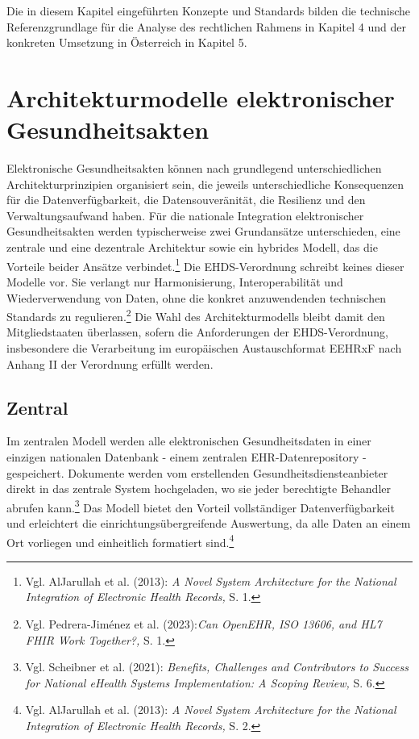 Die in diesem Kapitel eingeführten Konzepte und Standards bilden die technische Referenzgrundlage für die Analyse des rechtlichen Rahmens in Kapitel 4 und der konkreten Umsetzung in Österreich in Kapitel 5.

\section{Architekturmodelle elektronischer Gesundheitsakten}

Elektronische Gesundheitsakten können nach grundlegend unterschiedlichen Architekturprinzipien organisiert sein, die jeweils unterschiedliche Konsequenzen für die Datenverfügbarkeit, die Datensouveränität, die Resilienz und den Verwaltungsaufwand haben. Für die nationale Integration elektronischer Gesundheitsakten werden typischerweise zwei Grundansätze unterschieden, eine zentrale und eine dezentrale Architektur sowie ein hybrides Modell, das die Vorteile beider Ansätze verbindet.\footnote{Vgl. AlJarullah et al. (2013):  \textit{A Novel System Architecture for the National Integration of Electronic Health Records,} S. 1.} Die EHDS-Verordnung schreibt keines dieser Modelle vor. Sie verlangt nur Harmonisierung, Interoperabilität und Wiederverwendung von Daten, ohne die konkret anzuwendenden technischen Standards zu regulieren.\footnote{Vgl. Pedrera-Jiménez et al. (2023):\textit{Can OpenEHR, ISO 13606, and HL7 FHIR Work Together?,} S. 1.} Die Wahl des Architekturmodells bleibt damit den Mitgliedstaaten überlassen, sofern die Anforderungen der EHDS-Verordnung, insbesondere die Verarbeitung im europäischen Austauschformat EEHRxF nach Anhang II der Verordnung erfüllt werden.


    \subsection{Zentral}
Im zentralen Modell werden alle elektronischen Gesundheitsdaten in einer einzigen nationalen Datenbank - einem zentralen EHR-Datenrepository - gespeichert. Dokumente werden vom erstellenden Gesundheitsdiensteanbieter direkt in das zentrale System hochgeladen, wo sie jeder berechtigte Behandler abrufen kann.\footnote{Vgl. Scheibner et al. (2021): \textit{Benefits, Challenges and Contributors to Success for National eHealth Systems Implementation: A Scoping Review,} S. 6.} Das Modell bietet den Vorteil vollständiger Datenverfügbarkeit und erleichtert die einrichtungsübergreifende Auswertung, da alle Daten an einem Ort vorliegen und einheitlich formatiert sind.\footnote{Vgl. AlJarullah et al. (2013):  \textit{A Novel System Architecture for the National Integration of Electronic Health Records,} S. 2.}

